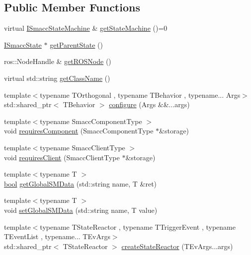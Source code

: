 \subsection*{Public Member Functions}
\begin{DoxyCompactItemize}
\item 
virtual \hyperlink{classsmacc_1_1ISmaccStateMachine}{I\+Smacc\+State\+Machine} \& \hyperlink{classsmacc_1_1ISmaccState_a562bb3f9a3ac16b8be71e4794c9e7523}{get\+State\+Machine} ()=0
\item 
\hyperlink{classsmacc_1_1ISmaccState}{I\+Smacc\+State} $\ast$ \hyperlink{classsmacc_1_1ISmaccState_a3484b4a32ef47a8650f08df67de4fae5}{get\+Parent\+State} ()
\item 
ros\+::\+Node\+Handle \& \hyperlink{classsmacc_1_1ISmaccState_a5d3f13b9d7ae7fdcf9da21c4ed935706}{get\+R\+O\+S\+Node} ()
\item 
virtual std\+::string \hyperlink{classsmacc_1_1ISmaccState_a5bf0b49d5ea6b9e8f45c26fa155b2664}{get\+Class\+Name} ()
\item 
{\footnotesize template$<$typename T\+Orthogonal , typename T\+Behavior , typename... Args$>$ }\\std\+::shared\+\_\+ptr$<$ T\+Behavior $>$ \hyperlink{classsmacc_1_1ISmaccState_af808541838ed7d6967088a87eb9c2e09}{configure} (Args \&\&...args)
\item 
{\footnotesize template$<$typename Smacc\+Component\+Type $>$ }\\void \hyperlink{classsmacc_1_1ISmaccState_afd5264c36403d22e124eea89a0122e59}{requires\+Component} (Smacc\+Component\+Type $\ast$\&storage)
\item 
{\footnotesize template$<$typename Smacc\+Client\+Type $>$ }\\void \hyperlink{classsmacc_1_1ISmaccState_a7f95c9f0a6ea2d6f18d1aec0519de4ac}{requires\+Client} (Smacc\+Client\+Type $\ast$\&storage)
\item 
{\footnotesize template$<$typename T $>$ }\\\hyperlink{classbool}{bool} \hyperlink{classsmacc_1_1ISmaccState_ad6811b03329d9e694e78bc4b1220c2c0}{get\+Global\+S\+M\+Data} (std\+::string name, T \&ret)
\item 
{\footnotesize template$<$typename T $>$ }\\void \hyperlink{classsmacc_1_1ISmaccState_a120fcda41b44a437ff2e3906ac9fa5ca}{set\+Global\+S\+M\+Data} (std\+::string name, T value)
\item 
{\footnotesize template$<$typename T\+State\+Reactor , typename T\+Trigger\+Event , typename T\+Event\+List , typename... T\+Ev\+Args$>$ }\\std\+::shared\+\_\+ptr$<$ T\+State\+Reactor $>$ \hyperlink{classsmacc_1_1ISmaccState_adfa47151c571de814f91003e3c7d1ff2}{create\+State\+Reactor} (T\+Ev\+Args...\+args)

\end{DoxyCompactItemize}
